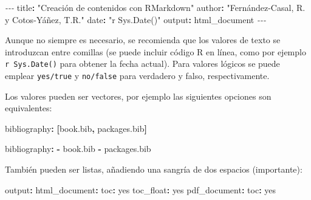 \documentclass[
]{book}
\newenvironment{Shaded}{\begin{snugshade}}{\end{snugshade}}
\newcommand{\AttributeTok}[1]{\textcolor[rgb]{0.77,0.63,0.00}{#1}}
\newcommand{\CharTok}[1]{\textcolor[rgb]{0.31,0.60,0.02}{#1}}
\newcommand{\FunctionTok}[1]{\textcolor[rgb]{0.00,0.00,0.00}{#1}}
\newcommand{\KeywordTok}[1]{\textcolor[rgb]{0.13,0.29,0.53}{\textbf{#1}}}
\newcommand{\PreprocessorTok}[1]{\textcolor[rgb]{0.56,0.35,0.01}{\textit{#1}}}
\newcommand{\StringTok}[1]{\textcolor[rgb]{0.31,0.60,0.02}{#1}}
\theoremstyle{break}
\theoremstyle{nonumberplain}
\begin{document}
\begin{Shaded}
\begin{Highlighting}[]
\PreprocessorTok{{-}{-}{-}}
\FunctionTok{title}\KeywordTok{:}\AttributeTok{ }\StringTok{"Creación de contenidos con RMarkdown"}
\FunctionTok{author}\KeywordTok{:}\AttributeTok{ }\StringTok{"Fernández{-}Casal, R. y Cotos{-}Yáñez, T.R."}
\FunctionTok{date}\KeywordTok{:}\AttributeTok{ }\StringTok{"\textasciigrave{}r Sys.Date()\textasciigrave{}"}
\FunctionTok{output}\KeywordTok{:}\AttributeTok{ html\_document}
\PreprocessorTok{{-}{-}{-}}
\end{Highlighting}
\end{Shaded}

Aunque no siempre es necesario, se recomienda que los valores de texto se introduzcan entre comillas (se puede incluir código R en línea, como por ejemplo \texttt{\textasciigrave{}r\ Sys.Date()\textasciigrave{}} para obtener la fecha actual). Para valores lógicos se puede emplear \texttt{yes/true} y \texttt{no/false} para verdadero y falso, respectivamente.

Los valores pueden ser vectores, por ejemplo las siguientes opciones son equivalentes:

\begin{Shaded}
\begin{Highlighting}[]
\FunctionTok{bibliography}\KeywordTok{:}\AttributeTok{ }\KeywordTok{[}\AttributeTok{book.bib}\KeywordTok{,}\AttributeTok{ packages.bib}\KeywordTok{]}
\end{Highlighting}
\end{Shaded}

\begin{Shaded}
\begin{Highlighting}[]
\FunctionTok{bibliography}\KeywordTok{:}
\KeywordTok{{-}}\AttributeTok{ book.bib}
\KeywordTok{{-}}\AttributeTok{ packages.bib}
\end{Highlighting}
\end{Shaded}

También pueden ser listas, añadiendo una sangría de dos espacios (importante):

\begin{Shaded}
\begin{Highlighting}[]
\FunctionTok{output}\KeywordTok{:}
\AttributeTok{  }\FunctionTok{html\_document}\KeywordTok{:}
\AttributeTok{    }\FunctionTok{toc}\KeywordTok{:}\AttributeTok{ }\CharTok{yes}
\AttributeTok{    }\FunctionTok{toc\_float}\KeywordTok{:}\AttributeTok{ }\CharTok{yes}
\AttributeTok{  }\FunctionTok{pdf\_document}\KeywordTok{:}
\AttributeTok{    }\FunctionTok{toc}\KeywordTok{:}\AttributeTok{ }\CharTok{yes}
\end{Highlighting}
\end{Shaded}
\end{document}
